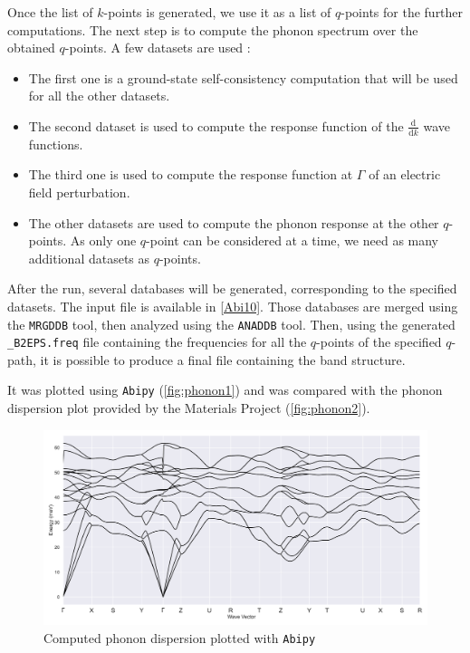 \documentclass[11pt,a4paper]{article}
\begin{document}
Once the list of $k$-points is generated, we use it as a list of $q$-points for the further computations. The next step is to compute the phonon spectrum over the obtained $q$-points. A few datasets are used : 
\begin{itemize}
\item The first one is a ground-state self-consistency computation that will be used for all the other datasets. 
\item The second dataset is used to compute the response function of the $\frac{\text{d}}{\text{d}k}$ wave functions.
\item The third one is used to compute the response function at $\Gamma$ of an electric field perturbation.
\item The other datasets are used to compute the phonon response at the other $q$-points. As only one $q$-point can be considered at a time, we need as many additional datasets as $q$-points.
\end{itemize}
After the run, several databases will be generated, corresponding to the specified datasets. The input file is available in \autoref{Abi10}. Those databases are merged using the \texttt{MRGDDB} tool, then analyzed using the \texttt{ANADDB} tool. Then, using the generated \texttt{\_B2EPS.freq} file containing the frequencies for all the $q$-points of the specified $q$-path, it is possible to produce a final file containing the band structure.

It was plotted using \texttt{Abipy} (\autoref{fig:phonon1}) and was compared with the phonon dispersion plot provided by the Materials Project (\autoref{fig:phonon2}).
\begin{figure}
\centering
\includegraphics[width=\textwidth]{images/phonon1.pdf}
\caption{Computed phonon dispersion plotted with \texttt{Abipy}}
\label{fig:phonon1}
\end{figure}
\end{document}
